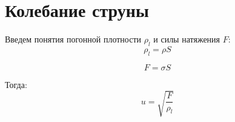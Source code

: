 \documentclass{article}
\begin{document}
    \section{Колебание струны}

    Введем понятия погонной плотности $\rho_l$ и силы натяжения $F$:
    \begin{equation*}
        \rho_l = \rho S
    \end{equation*}

    \begin{equation*}
        F = \sigma S
    \end{equation*}

    Тогда:
    \begin{equation}
        u = \sqrt {\frac {F} {\rho_l}}
    \end{equation}
\end{document}
